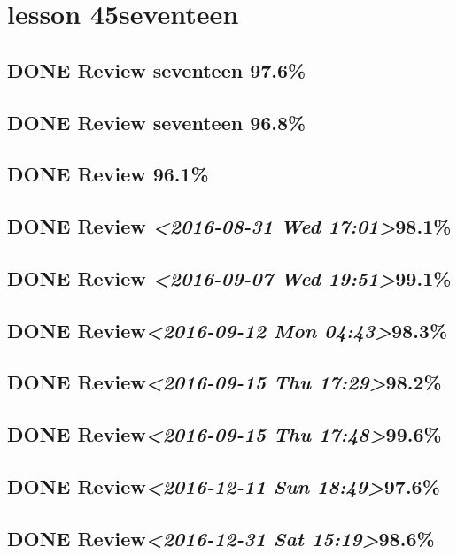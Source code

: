 \documentclass[11pt]{ctexart}
\begin{document}
\section{lesson 45seventeen}
\label{sec:orgbff1b8c}
\subsection{{\bfseries\sffamily DONE} Review seventeen 97.6\%}
\label{sec:orgf8fce6b}
\subsection{{\bfseries\sffamily DONE} Review seventeen 96.8\%}
\label{sec:org244e925}

\subsection{{\bfseries\sffamily DONE} Review 96.1\%}
\label{sec:orgdc666ad}
\subsection{{\bfseries\sffamily DONE} Review \textit{<2016-08-31 Wed 17:01>}98.1\%}
\label{sec:orgf49ed69}
\subsection{{\bfseries\sffamily DONE} Review \textit{<2016-09-07 Wed 19:51>}99.1\%}
\label{sec:org8d0eead}
\subsection{{\bfseries\sffamily DONE} Review\textit{<2016-09-12 Mon 04:43>}98.3\%}
\label{sec:org02684c5}
\subsection{{\bfseries\sffamily DONE} Review\textit{<2016-09-15 Thu 17:29>}98.2\%}
\label{sec:org63d38f1}
\subsection{{\bfseries\sffamily DONE} Review\textit{<2016-09-15 Thu 17:48>}99.6\%}
\label{sec:orga6251ad}
\subsection{{\bfseries\sffamily DONE} Review\textit{<2016-12-11 Sun 18:49>}97.6\%}
\label{sec:org30c9b02}
\subsection{{\bfseries\sffamily DONE} Review\textit{<2016-12-31 Sat 15:19>}98.6\%}
\label{sec:org4f4514b}
\end{document}
